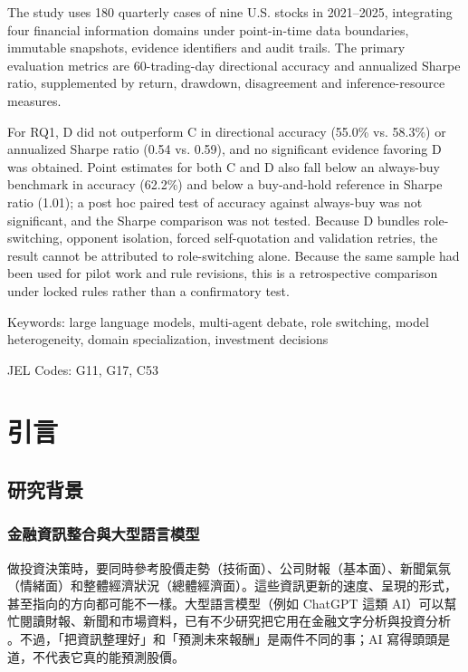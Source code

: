 \documentclass[12pt,a4paper]{article}
\numberwithin{table}{section}
\numberwithin{figure}{section}
\begin{document}
The study uses 180 quarterly cases of nine U.S. stocks in 2021--2025, integrating four financial information domains under point-in-time data boundaries, immutable snapshots, evidence identifiers and audit trails. The primary evaluation metrics are 60-trading-day directional accuracy and annualized Sharpe ratio, supplemented by return, drawdown, disagreement and inference-resource measures.

For RQ1, D did not outperform C in directional accuracy (55.0\% vs. 58.3\%) or annualized Sharpe ratio (0.54 vs. 0.59), and no significant evidence favoring D was obtained. Point estimates for both C and D also fall below an always-buy benchmark in accuracy (62.2\%) and below a buy-and-hold reference in Sharpe ratio (1.01); a post hoc paired test of accuracy against always-buy was not significant, and the Sharpe comparison was not tested. Because D bundles role-switching, opponent isolation, forced self-quotation and validation retries, the result cannot be attributed to role-switching alone. Because the same sample had been used for pilot work and rule revisions, this is a retrospective comparison under locked rules rather than a confirmatory test.

\vspace{0.6cm}
\noindent Keywords: large language models, multi-agent debate, role switching, model heterogeneity, domain specialization, investment decisions

\noindent JEL Codes: G11, G17, C53
\clearpage
\tableofcontents
\clearpage
\listoftables
\clearpage
\listoffigures
\clearpage
{}

\clearpage\section{引言}

\subsection{研究背景}

\subsubsection{金融資訊整合與大型語言模型}
做投資決策時，要同時參考股價走勢（技術面）、公司財報（基本面）、新聞氣氛（情緒面）和整體經濟狀況（總體經濟面）。這些資訊更新的速度、呈現的形式，甚至指向的方向都可能不一樣。大型語言模型（例如 ChatGPT 這類 AI）可以幫忙閱讀財報、新聞和市場資料，已有不少研究把它用在金融文字分析與投資分析 \citep{lopezlira2023chatgpt,araci2019finbert,liu2023fingpt}。不過，「把資訊整理好」和「預測未來報酬」是兩件不同的事；AI 寫得頭頭是道，不代表它真的能預測股價。
\end{document}

